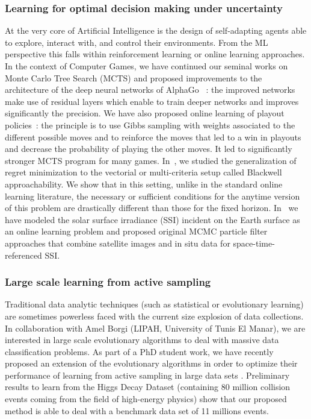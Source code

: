 \subsubsection{Learning for optimal decision making under uncertainty}

At the very core of Artificial Intelligence is the design of self-adapting agents able to explore, interact with, and control their environments. From the ML perspective this falls within reinforcement learning or online learning approaches. In the context of Computer Games, we have continued our seminal works on Monte Carlo Tree Search (MCTS) and proposed improvements to the architecture of the deep neural networks of AlphaGo ~\cite{cazenave2017residual}: the improved networks make use of residual layers which enable to train deeper networks and improves significantly the precision. We have also proposed online learning of playout policies~\cite{Cazenave2016Playout-1222820,Cazenave2015Generalized-1222829}: the principle is to use Gibbs sampling with weights associated to the different possible moves and to reinforce the moves that led to a win in playouts and decrease the probability of playing the other moves. It led to significantly stronger MCTS program for many games. In~\cite{FLP2016}, we studied the generalization of regret minimization to the vectorial or multi-criteria setup called Blackwell approachability. We show that in this setting, unlike in the standard online learning literature, the necessary or sufficient conditions for the anytime version of this problem are drastically different than those for the fixed horizon. In~\cite{Linguet2015Estimating-1260037,Linguet2016A-1222799} we have modeled the solar surface irradiance (SSI) incident on the Earth surface as an online learning problem and proposed original MCMC particle filter approaches that combine satellite images and in situ data for space-time-referenced SSI.

\subsubsection{Large scale learning from active sampling}

Traditional data analytic techniques (such as statistical or evolutionary learning) are sometimes powerless faced with the current size explosion of data collections.  In collaboration with Amel Borgi (LIPAH, University of Tunis El Manar), we are interested in large scale evolutionary algorithms to deal with massive data classification problems. As part of a PhD student work, we have recently proposed an extension of the evolutionary algorithms in order to optimize their performance of learning from active sampling in  large  data sets \cite{Hmida2016Sampling-1298248,Hmida2016Hierarchical-1241346}. Preliminary results to learn from the Higgs Decay Dataset (containing 80 million collision events coming from the field of high-energy physics) show that our proposed method is able to deal with a benchmark data set of 11 millions events.

